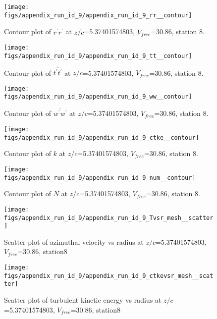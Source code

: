 \begin{figure}[H]
\centering
\texttt{[image: figs/appendix\_run\_id\_9/appendix\_run\_id\_9\_rr\_\_contour]}
\caption{Contour plot of $\overline{r^\prime r^\prime}$ at $z/c$=5.37401574803, $V_{free}$=30.86, station 8.}
\label{fig:appendix_run_id_9_rr__contour}
\end{figure}


\begin{figure}[H]
\centering
\texttt{[image: figs/appendix\_run\_id\_9/appendix\_run\_id\_9\_tt\_\_contour]}
\caption{Contour plot of $\overline{t^\prime t^\prime}$ at $z/c$=5.37401574803, $V_{free}$=30.86, station 8.}
\label{fig:appendix_run_id_9_tt__contour}
\end{figure}


\begin{figure}[H]
\centering
\texttt{[image: figs/appendix\_run\_id\_9/appendix\_run\_id\_9\_ww\_\_contour]}
\caption{Contour plot of $\overline{w^\prime w^\prime}$ at $z/c$=5.37401574803, $V_{free}$=30.86, station 8.}
\label{fig:appendix_run_id_9_ww__contour}
\end{figure}


\begin{figure}[H]
\centering
\texttt{[image: figs/appendix\_run\_id\_9/appendix\_run\_id\_9\_ctke\_\_contour]}
\caption{Contour plot of $k$ at $z/c$=5.37401574803, $V_{free}$=30.86, station 8.}
\label{fig:appendix_run_id_9_ctke__contour}
\end{figure}


\begin{figure}[H]
\centering
\texttt{[image: figs/appendix\_run\_id\_9/appendix\_run\_id\_9\_num\_\_contour]}
\caption{Contour plot of $N$ at $z/c$=5.37401574803, $V_{free}$=30.86, station 8.}
\label{fig:appendix_run_id_9_num__contour}
\end{figure}


\begin{figure}[H]
\centering
\texttt{[image: figs/appendix\_run\_id\_9/appendix\_run\_id\_9\_Tvsr\_mesh\_\_scatter]}
\caption{Scatter plot of azimuthal velocity vs radius at $z/c$=5.37401574803, $V_{free}$=30.86, station8}
\label{fig:appendix_run_id_9_Tvsr_mesh__scatter}
\end{figure}


\begin{figure}[H]
\centering
\texttt{[image: figs/appendix\_run\_id\_9/appendix\_run\_id\_9\_ctkevsr\_mesh\_\_scatter]}
\caption{Scatter plot of turbulent kinetic energy vs radius at $z/c$=5.37401574803, $V_{free}$=30.86, station8}
\label{fig:appendix_run_id_9_ctkevsr_mesh__scatter}
\end{figure}


